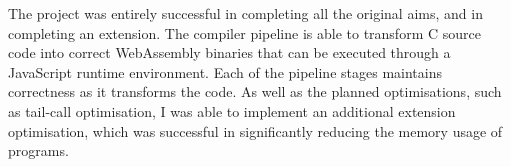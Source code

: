 \documentclass[20-proforma.tex]{subfiles}
\begin{document}
The project was entirely successful in completing all the original aims, and in completing an extension.
The compiler pipeline is able to transform C source code into correct WebAssembly binaries that can be executed through a JavaScript runtime environment.
Each of the pipeline stages maintains correctness as it transforms the code.
As well as the planned optimisations, such as tail-call optimisation, I was able to implement an additional extension optimisation, which was successful in significantly reducing the memory usage of programs.
\end{document}
